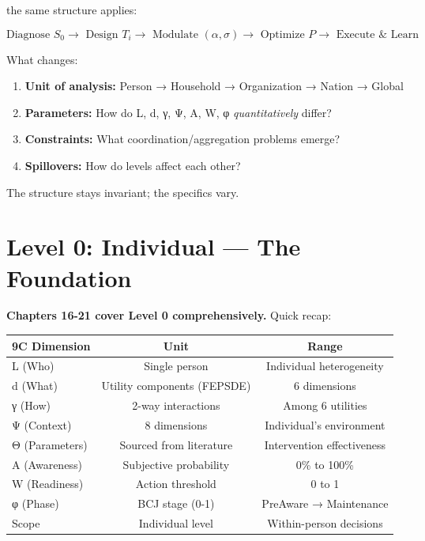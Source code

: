 the same structure applies:

\begin{equation}
\text{Diagnose } S_0 \to \text{ Design } T_i \to \text{ Modulate } (\alpha, \sigma) \to \text{ Optimize } P \to \text{ Execute } \& \text{ Learn}
\end{equation}

What changes:

\begin{enumerate}
\item \textbf{Unit of analysis:} Person → Household → Organization → Nation → Global
\item \textbf{Parameters:} How do L, d, γ, Ψ, A, W, φ \emph{quantitatively} differ?
\item \textbf{Constraints:} What coordination/aggregation problems emerge?
\item \textbf{Spillovers:} How do levels affect each other?
\end{enumerate}

The structure stays invariant; the specifics vary.


\section{Level 0: Individual --- The Foundation}
\label{sec:level0-individual}

\textbf{Chapters 16-21 cover Level 0 comprehensively.} Quick recap:

\begin{center}
\begin{tabular}{@{}lcc@{}}
\toprule
\textbf{9C Dimension} & \textbf{Unit} & \textbf{Range} \\
\midrule
L (Who) & Single person & Individual heterogeneity \\
d (What) & Utility components (FEPSDE) & 6 dimensions \\
γ (How) & 2-way interactions & Among 6 utilities \\
Ψ (Context) & 8 dimensions & Individual's environment \\
Θ (Parameters) & Sourced from literature & Intervention effectiveness \\
A (Awareness) & Subjective probability & 0\% to 100\% \\
W (Readiness) & Action threshold & 0 to 1 \\
φ (Phase) & BCJ stage (0-1) & PreAware → Maintenance \\
Scope & Individual level & Within-person decisions \\
\midrule
\end{tabular}
\end{center}

